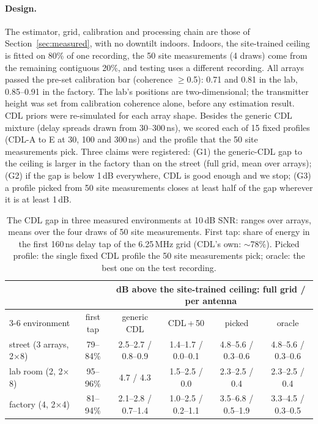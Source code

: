 \documentclass[11pt]{article}
\begin{document}
\paragraph{Design.} The estimator, grid, calibration and processing chain are
those of Section~\ref{sec:measured}, with no downtilt indoors. Indoors, the
site-trained ceiling is fitted on 80\% of one recording, the 50 site
measurements (4 draws) come from the remaining contiguous 20\%, and testing
uses a different recording. All arrays passed the pre-set calibration bar
(coherence $\geq$0.5): 0.71 and 0.81 in the lab, 0.85--0.91 in the factory.
The lab's positions are two-dimensional; the transmitter height was set from
calibration coherence alone, before any estimation result. CDL priors were
re-simulated for each array shape. Besides the generic CDL mixture (delay
spreads drawn from 30--300\,ns), we scored each of 15 fixed profiles (CDL-A to
E at 30, 100 and 300\,ns) and the profile that the 50 site measurements pick.
Three claims were registered: (G1) the generic-CDL gap to the ceiling is
larger in the factory than on the street (full grid, mean over arrays); (G2)
if the gap is below 1\,dB everywhere, CDL is good enough and we stop; (G3) a
profile picked from 50 site measurements closes at least half of the gap
wherever it is at least 1\,dB.

\begin{table}[t]
\centering
\footnotesize
\setlength{\tabcolsep}{4pt}
\begin{tabular}{lccccc}
\toprule
 & & \multicolumn{4}{c}{dB above the site-trained ceiling: full grid / per antenna} \\
\cmidrule(l){3-6}
environment & first tap & generic CDL & CDL\,+\,50 & picked & oracle \\
\midrule
street (3 arrays, 2$\times$8) & 79--84\% & 2.5--2.7 / 0.8--0.9 & 1.4--1.7 / 0.0--0.1 & 4.8--5.6 / 0.3--0.6 & 4.8--5.6 / 0.3--0.6 \\
lab room (2, 2$\times$8) & 95--96\% & 4.7 / 4.3 & 1.5--2.5 / 0.0 & 2.3--2.5 / 0.4 & 2.3--2.5 / 0.4 \\
factory (4, 2$\times$4) & 81--94\% & 2.1--2.8 / 0.7--1.4 & 1.0--2.5 / 0.2--1.1 & 3.5--6.8 / 0.5--1.9 & 3.3--4.5 / 0.3--0.5 \\
\bottomrule
\end{tabular}
\caption{The CDL gap in three measured environments at 10\,dB SNR: ranges over
arrays, means over the four draws of 50 site measurements. First tap: share of
energy in the first 160\,ns delay tap of the 6.25\,MHz grid (CDL's own:
$\sim$78\%). Picked profile: the single fixed CDL profile the 50 site
measurements pick; oracle: the best one on the test recording.}
\label{tab:cdlgap}
\end{table}
\end{document}
